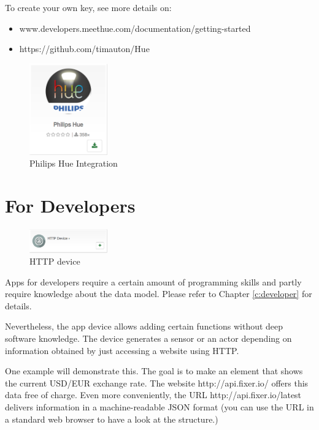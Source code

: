 To create your own key, see more details on:
\begin{itemize}
\item www.developers.meethue.com/documentation/getting-started
\item https://github.com/timauton/Hue
\end{itemize}
\begin{figure}
\begin{center}
\includegraphics[width=0.3\textwidth]{pngs/cap6/app44.png}
\caption{Philips Hue Integration}
\label{app44}
\end{center}
\end{figure}


\section{For Developers}

\begin{figure}
\begin{center}
\includegraphics[width=0.3\textwidth]{pngs/cap6/app28.png}
\caption{HTTP device}
\label{app28}
\end{center}
\end{figure}

Apps for developers require a certain amount of programming skills and partly require 
knowledge about the \zway data model. Please refer to Chapter \ref{c:developer} for details.

Nevertheless, the app  device allows adding certain functions without deep 
software knowledge. The  device generates a sensor or an actor depending on 
information obtained by just accessing a website using HTTP.

One example will demonstrate this. The goal is to make an element that shows the current 
USD/EUR exchange rate. The website http://api.fixer.io/ offers this data free of charge. 
Even more conveniently, the URL http://api.fixer.io/latest delivers information in a 
machine-readable JSON format (you can use the URL in a standard web browser to have a 
look at the structure.)


